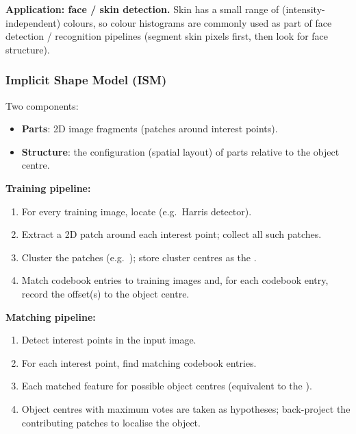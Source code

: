 \textbf{Application: face / skin detection.} Skin has a small range of (intensity-independent) colours, so colour histograms are commonly used as part of face detection / recognition pipelines (segment skin pixels first, then look for face structure).

\bigseparator

\subsubsection{Implicit Shape Model (ISM)}

\begin{defbox}
Two components:
\begin{itemize}
  \item \textbf{Parts}: 2D image fragments (patches around interest points).
  \item \textbf{Structure}: the configuration (spatial layout) of parts relative to the object centre.
\end{itemize}
\end{defbox}

\textbf{Training pipeline:}
\begin{enumerate}
  \item For every training image, locate  (e.g.\ Harris detector).
  \item Extract a 2D patch around each interest point; collect all such patches.
  \item Cluster the patches (e.g.\ ); store cluster centres as the .
  \item Match codebook entries to training images and, for each codebook entry, record the offset(s) to the object centre.
\end{enumerate}

\textbf{Matching pipeline:}
\begin{enumerate}
  \item Detect interest points in the input image.
  \item For each interest point, find matching codebook entries.
  \item Each matched feature  for possible object centres (equivalent to the ).
  \item Object centres with maximum votes are taken as hypotheses; back-project the contributing patches to localise the object.
\end{enumerate}

